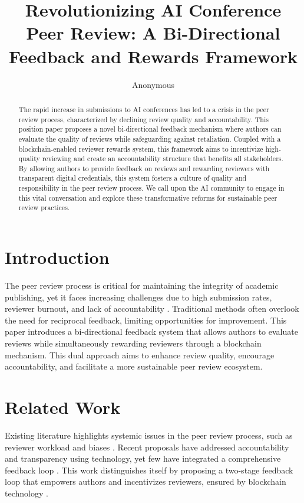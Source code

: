 \documentclass{article} %
\title{
Revolutionizing AI Conference Peer Review: A Bi-Directional Feedback and Rewards Framework
}
\author{Anonymous}
\theoremstyle{plain}
\theoremstyle{definition}
\theoremstyle{remark}
\begin{document}
\maketitle

\begin{abstract}
The rapid increase in submissions to AI conferences has led to a crisis in the peer review process, characterized by declining review quality and accountability. This position paper proposes a novel bi-directional feedback mechanism where authors can evaluate the quality of reviews while safeguarding against retaliation. Coupled with a blockchain-enabled reviewer rewards system, this framework aims to incentivize high-quality reviewing and create an accountability structure that benefits all stakeholders. By allowing authors to provide feedback on reviews and rewarding reviewers with transparent digital credentials, this system fosters a culture of quality and responsibility in the peer review process. We call upon the AI community to engage in this vital conversation and explore these transformative reforms for sustainable peer review practices.
\end{abstract}

\section{Introduction}
The peer review process is critical for maintaining the integrity of academic publishing, yet it faces increasing challenges due to high submission rates, reviewer burnout, and lack of accountability \cite{kim2025positionta,mishra2025challengesit}. Traditional methods often overlook the need for reciprocal feedback, limiting opportunities for improvement. This paper introduces a bi-directional feedback system that allows authors to evaluate reviews while simultaneously rewarding reviewers through a blockchain mechanism. This dual approach aims to enhance review quality, encourage accountability, and facilitate a more sustainable peer review ecosystem.

\section{Related Work}
Existing literature highlights systemic issues in the peer review process, such as reviewer workload and biases \cite{mishra2025challengesit}. Recent proposals have addressed accountability and transparency using technology, yet few have integrated a comprehensive feedback loop \cite{v2025enhancingat,shrestha2024acs}. This work distinguishes itself by proposing a two-stage feedback loop that empowers authors and incentivizes reviewers, ensured by blockchain technology \cite{wardani2025applicationob}.
\end{document}
